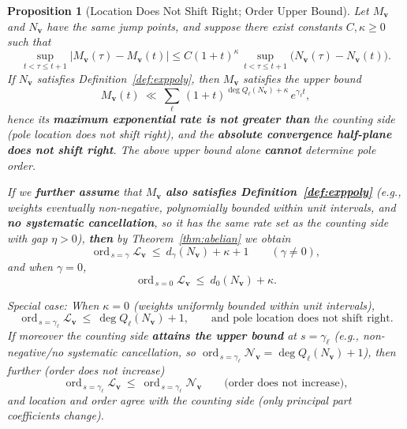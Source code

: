 \documentclass[11pt,a4paper]{article}
\newtheorem{proposition}[theorem]{Proposition}
\theoremstyle{remark}
\DeclareMathOperator{\ord}{ord}
\begin{document}
\begin{proposition}[Location Does Not Shift Right; Order Upper Bound]\label{prop:weight}
Let $M_{\mathbf{v}}$ and $N_{\mathbf{v}}$ have the same jump points, and suppose there exist constants $C,\kappa\ge0$ such that
\begin{equation}
\sup_{t<\tau\le t+1}\big|M_{\mathbf{v}}(\tau)-M_{\mathbf{v}}(t)\big|
\le C(1+t)^\kappa\,
\sup_{t<\tau\le t+1}\big(N_{\mathbf{v}}(\tau)-N_{\mathbf{v}}(t)\big).
\end{equation}
If $N_{\mathbf{v}}$ satisfies Definition~\ref{def:exppoly}, then $M_{\mathbf{v}}$ satisfies the upper bound
\begin{equation}
M_{\mathbf{v}}(t)\ \ll\ \sum_{\ell}\,(1+t)^{\deg Q_\ell(N_{\mathbf{v}})+\kappa}\,e^{\gamma_\ell t},
\end{equation}
hence its \textbf{maximum exponential rate is not greater than} the counting side (pole location does not shift right), and the \textbf{absolute convergence half-plane does not shift right}. The above upper bound alone \textbf{cannot} determine pole order.

If we \textbf{further assume} that $M_{\mathbf{v}}$ \textbf{also satisfies Definition~\ref{def:exppoly}} (e.g., weights eventually non-negative, polynomially bounded within unit intervals, and \textbf{no systematic cancellation}, so it has the same rate set as the counting side with gap $\eta>0$), \textbf{then} by Theorem~\ref{thm:abelian} we obtain
\begin{equation}
\ord_{\,s=\gamma}\mathcal{L}_{\mathbf{v}}\ \le\ d_\gamma(N_{\mathbf{v}})+\kappa+1\qquad(\gamma\ne 0),
\end{equation}
and when $\gamma=0$,
\begin{equation}
\ord_{\,s=0}\mathcal{L}_{\mathbf{v}}\ \le\ d_0(N_{\mathbf{v}})+\kappa .
\end{equation}

Special case: When $\kappa=0$ (weights uniformly bounded within unit intervals),
\begin{equation}
\ord_{\,s=\gamma_\ell}\mathcal{L}_{\mathbf{v}}\ \le\ \deg Q_\ell(N_{\mathbf{v}})+1,\qquad\text{and pole location does not shift right}.
\end{equation}
If moreover the counting side \textbf{attains the upper bound} at $s=\gamma_\ell$ (e.g., non-negative/no systematic cancellation, so $\ord_{\,s=\gamma_\ell}\mathscr{N}_{\mathbf{v}}=\deg Q_\ell(N_{\mathbf{v}})+1$), then further (order does not increase)
\begin{equation}
\ord_{\,s=\gamma_\ell}\mathcal{L}_{\mathbf{v}}\ \le\ \ord_{\,s=\gamma_\ell}\mathscr{N}_{\mathbf{v}}\qquad\text{(order does not increase)},
\end{equation}
and location and order agree with the counting side (only principal part coefficients change).
\end{proposition}
\end{document}
